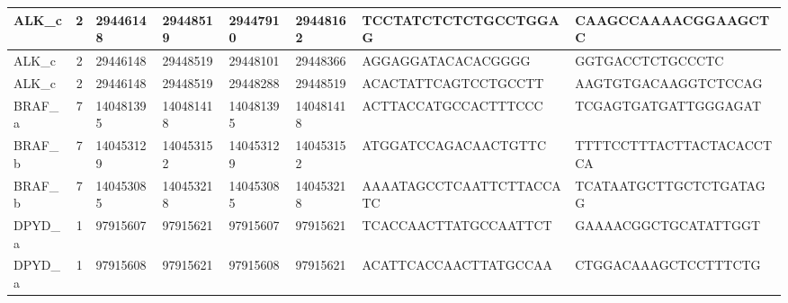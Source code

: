 \begin{landscape}
\begin{longtable}{| p{} | p{} | p{} | p{} | p{} | p{} | p{} | p{} |}
\multicolumn{1}{|l|}{ALK\_c}     & \multicolumn{1}{c|}{2}  & \multicolumn{1}{l|}{29446148}  & \multicolumn{1}{l|}{29448519}  & \multicolumn{1}{l|}{29447910}  & \multicolumn{1}{l|}{29448162}  & \multicolumn{1}{l|}{TCCTATCTCTCTGCCTGGAG}            & \multicolumn{1}{l|}{CAAGCCAAAACGGAAGCTC}           \\ \hline
\multicolumn{1}{|l|}{ALK\_c}     & \multicolumn{1}{c|}{2}  & \multicolumn{1}{l|}{29446148}  & \multicolumn{1}{l|}{29448519}  & \multicolumn{1}{l|}{29448101}  & \multicolumn{1}{l|}{29448366}  & \multicolumn{1}{l|}{AGGAGGATACACACGGGG}              & \multicolumn{1}{l|}{GGTGACCTCTGCCCTC}              \\ \hline
\multicolumn{1}{|l|}{ALK\_c}     & \multicolumn{1}{c|}{2}  & \multicolumn{1}{l|}{29446148}  & \multicolumn{1}{l|}{29448519}  & \multicolumn{1}{l|}{29448288}  & \multicolumn{1}{l|}{29448519}  & \multicolumn{1}{l|}{ACACTATTCAGTCCTGCCTT}            & \multicolumn{1}{l|}{AAGTGTGACAAGGTCTCCAG}          \\ \hline
\multicolumn{1}{|l|}{BRAF\_a}    & \multicolumn{1}{c|}{7}  & \multicolumn{1}{l|}{140481395} & \multicolumn{1}{l|}{140481418} & \multicolumn{1}{l|}{140481395} & \multicolumn{1}{l|}{140481418} & \multicolumn{1}{l|}{ACTTACCATGCCACTTTCCC}            & \multicolumn{1}{l|}{TCGAGTGATGATTGGGAGAT}          \\ \hline
\multicolumn{1}{|l|}{BRAF\_b}    & \multicolumn{1}{c|}{7}  & \multicolumn{1}{l|}{140453129} & \multicolumn{1}{l|}{140453152} & \multicolumn{1}{l|}{140453129} & \multicolumn{1}{l|}{140453152} & \multicolumn{1}{l|}{ATGGATCCAGACAACTGTTC}            & \multicolumn{1}{l|}{TTTTCCTTTACTTACTACACCTCA}      \\ \hline
\multicolumn{1}{|l|}{BRAF\_b}    & \multicolumn{1}{c|}{7}  & \multicolumn{1}{l|}{140453085} & \multicolumn{1}{l|}{140453218} & \multicolumn{1}{l|}{140453085} & \multicolumn{1}{l|}{140453218} & \multicolumn{1}{l|}{AAAATAGCCTCAATTCTTACCATC}        & \multicolumn{1}{l|}{TCATAATGCTTGCTCTGATAGG}        \\ \hline
\multicolumn{1}{|l|}{DPYD\_a}    & \multicolumn{1}{c|}{1}  & \multicolumn{1}{l|}{97915607}  & \multicolumn{1}{l|}{97915621}  & \multicolumn{1}{l|}{97915607}  & \multicolumn{1}{l|}{97915621}  & \multicolumn{1}{l|}{TCACCAACTTATGCCAATTCT}           & \multicolumn{1}{l|}{GAAAACGGCTGCATATTGGT}          \\ \hline
\multicolumn{1}{|l|}{DPYD\_a}    & \multicolumn{1}{c|}{1}  & \multicolumn{1}{l|}{97915608}  & \multicolumn{1}{l|}{97915621}  & \multicolumn{1}{l|}{97915608}  & \multicolumn{1}{l|}{97915621}  & \multicolumn{1}{l|}{ACATTCACCAACTTATGCCAA}           & \multicolumn{1}{l|}{CTGGACAAAGCTCCTTTCTG}          \\ \hline

\end{longtable}
\end{landscape}
